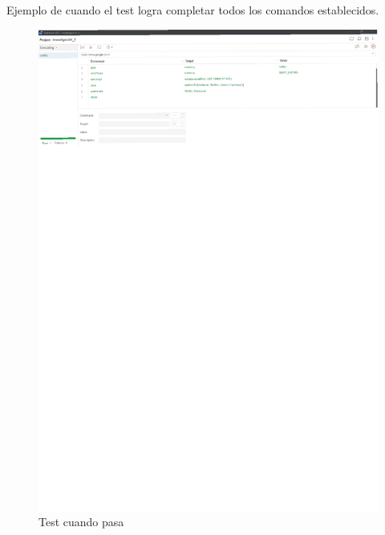 \documentclass[conference]{IEEEtran}
\begin{document}
Ejemplo de cuando el test logra completar todos los comandos establecidos.

\begin{figure}[H]
\centering
\includegraphics[scale=0.47]{imagenes/16seleniumpass.pdf}
\caption{Test cuando pasa}
\end{figure}
\end{document}
